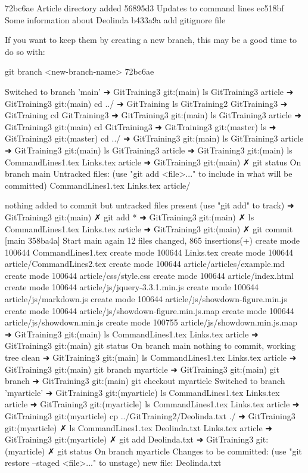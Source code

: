   72bc6ae Article directory added
  56895d3 Updates to command lines
  ec518bf Some information about Deolinda
  b433a9a add gitignore file

If you want to keep them by creating a new branch, this may be a good time
to do so with:

 git branch <new-branch-name> 72bc6ae

Switched to branch 'main'
➜  GitTraining3 git:(main) ls
GitTraining3 article
➜  GitTraining3 git:(main) cd ../
➜  GitTraining ls
GitTraining2 GitTraining3
➜  GitTraining cd GitTraining3 
➜  GitTraining3 git:(main) ls
GitTraining3 article
➜  GitTraining3 git:(main) cd GitTraining3 
➜  GitTraining3 git:(master) ls
➜  GitTraining3 git:(master) cd ../
➜  GitTraining3 git:(main) ls
GitTraining3 article
➜  GitTraining3 git:(main) ls        
GitTraining3 article
➜  GitTraining3 git:(main) ls
CommandLines1.tex Links.tex         article
➜  GitTraining3 git:(main) ✗ git status
On branch main
Untracked files:
  (use "git add <file>..." to include in what will be committed)
	CommandLines1.tex
	Links.tex
	article/

nothing added to commit but untracked files present (use "git add" to track)
➜  GitTraining3 git:(main) ✗ git add *
➜  GitTraining3 git:(main) ✗ ls
CommandLines1.tex Links.tex         article
➜  GitTraining3 git:(main) ✗ git commit
[main 358ba4a] Start main again
 12 files changed, 865 insertions(+)
 create mode 100644 CommandLines1.tex
 create mode 100644 Links.tex
 create mode 100644 article/CommandLines2.tex
 create mode 100644 article/articles/example.md
 create mode 100644 article/css/style.css
 create mode 100644 article/index.html
 create mode 100644 article/js/jquery-3.3.1.min.js
 create mode 100644 article/js/markdown.js
 create mode 100644 article/js/showdown-figure.min.js
 create mode 100644 article/js/showdown-figure.min.js.map
 create mode 100644 article/js/showdown.min.js
 create mode 100755 article/js/showdown.min.js.map
➜  GitTraining3 git:(main) ls
CommandLines1.tex Links.tex         article
➜  GitTraining3 git:(main) git status
On branch main
nothing to commit, working tree clean
➜  GitTraining3 git:(main) ls
CommandLines1.tex Links.tex         article
➜  GitTraining3 git:(main) git branch myarticle
➜  GitTraining3 git:(main) git branch
➜  GitTraining3 git:(main) git checkout myarticle 
Switched to branch 'myarticle'
➜  GitTraining3 git:(myarticle) ls
CommandLines1.tex Links.tex         article
➜  GitTraining3 git:(myarticle) ls
CommandLines1.tex Links.tex         article
➜  GitTraining3 git:(myarticle) cp ../GitTraining2/Deolinda.txt ./
➜  GitTraining3 git:(myarticle) ✗ ls
CommandLines1.tex Deolinda.txt      Links.tex         article
➜  GitTraining3 git:(myarticle) ✗ git add Deolinda.txt 
➜  GitTraining3 git:(myarticle) ✗ git status
On branch myarticle
Changes to be committed:
  (use "git restore --staged <file>..." to unstage)
	new file:   Deolinda.txt

